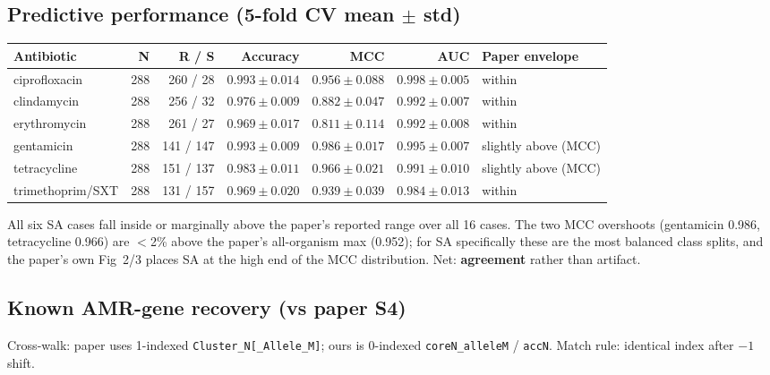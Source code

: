 \documentclass[11pt]{article}
\begin{document}
\subsection{Predictive performance (5-fold CV mean $\pm$ std)}
\begin{center}
\small
\begin{tabular}{lrrrrrl}
\toprule
\textbf{Antibiotic} & \textbf{N} & \textbf{R / S} & \textbf{Accuracy} & \textbf{MCC} & \textbf{AUC} & \textbf{Paper envelope} \\
\midrule
ciprofloxacin      & 288 & 260 / 28  & $0.993 \pm 0.014$ & $0.956 \pm 0.088$ & $0.998 \pm 0.005$ & within \\
clindamycin        & 288 & 256 / 32  & $0.976 \pm 0.009$ & $0.882 \pm 0.047$ & $0.992 \pm 0.007$ & within \\
erythromycin       & 288 & 261 / 27  & $0.969 \pm 0.017$ & $0.811 \pm 0.114$ & $0.992 \pm 0.008$ & within \\
gentamicin         & 288 & 141 / 147 & $0.993 \pm 0.009$ & $0.986 \pm 0.017$ & $0.995 \pm 0.007$ & slightly above (MCC) \\
tetracycline       & 288 & 151 / 137 & $0.983 \pm 0.011$ & $0.966 \pm 0.021$ & $0.991 \pm 0.010$ & slightly above (MCC) \\
trimethoprim/SXT   & 288 & 131 / 157 & $0.969 \pm 0.020$ & $0.939 \pm 0.039$ & $0.984 \pm 0.013$ & within \\
\bottomrule
\end{tabular}
\end{center}

All six SA cases fall inside or marginally above the paper's reported range over all 16 cases. The two MCC overshoots (gentamicin 0.986, tetracycline 0.966) are $<$2\% above the paper's all-organism max (0.952); for SA specifically these are the most balanced class splits, and the paper's own Fig~2/3 places SA at the high end of the MCC distribution. Net: \textbf{agreement} rather than artifact.

\subsection{Known AMR-gene recovery (vs paper S4)}
Cross-walk: paper uses 1-indexed \texttt{Cluster\_N[\_Allele\_M]}; ours is 0-indexed \texttt{coreN\_alleleM} / \texttt{accN}. Match rule: identical index after $-1$ shift.
\end{document}
